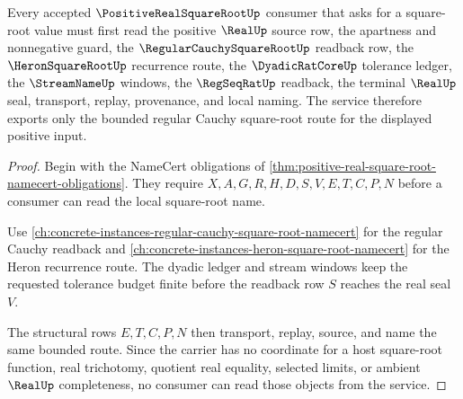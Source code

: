 \begin{theorem}
\label{thm:positive-real-square-root-regular-cauchy-service}
Every accepted $\PositiveRealSquareRootUp$ consumer that asks for a square-root value must first read the positive $\RealUp$ source row, the apartness and nonnegative guard, the $\RegularCauchySquareRootUp$ readback row, the $\HeronSquareRootUp$ recurrence route, the $\DyadicRatCoreUp$ tolerance ledger, the $\StreamNameUp$ windows, the $\RegSeqRatUp$ readback, the terminal $\RealUp$ seal, transport, replay, provenance, and local naming. The service therefore exports only the bounded regular Cauchy square-root route for the displayed positive input.
\end{theorem}
\begin{proof}
Begin with the NameCert obligations of \autoref{thm:positive-real-square-root-namecert-obligations}. They require $X,A,G,R,H,D,S,V,E,T,C,P,N$ before a consumer can read the local square-root name.

Use \autoref{ch:concrete-instances-regular-cauchy-square-root-namecert} for the regular Cauchy readback and \autoref{ch:concrete-instances-heron-square-root-namecert} for the Heron recurrence route. The dyadic ledger and stream windows keep the requested tolerance budget finite before the readback row $S$ reaches the real seal $V$.

The structural rows $E,T,C,P,N$ then transport, replay, source, and name the same bounded route. Since the carrier has no coordinate for a host square-root function, real trichotomy, quotient real equality, selected limits, or ambient $\RealUp$ completeness, no consumer can read those objects from the service.
\end{proof}




